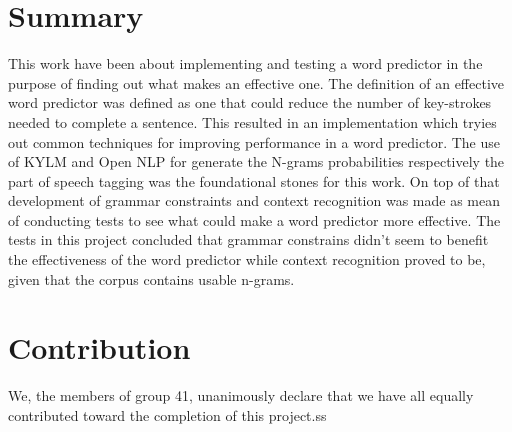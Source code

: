 \section{Summary}
This work have been about implementing and testing a word predictor in the purpose of finding out what makes an effective one. The definition of an effective word predictor was defined as one that could reduce the number of key-strokes needed to complete a sentence. This resulted in an implementation which tryies out common techniques for improving performance in a word predictor. The use of KYLM and Open NLP for generate the N-grams probabilities respectively the part of speech tagging was the foundational stones for this work. On top of that development of grammar constraints and context recognition was made as mean of conducting tests to see what could make a word predictor more effective. The tests in this project concluded that grammar constrains didn’t seem to benefit the effectiveness of the word predictor while context recognition proved to be, given that the corpus contains usable n-grams.  
\section{Contribution}
We, the members of group 41, unanimously declare that we have all equally contributed toward the completion of this project.ss